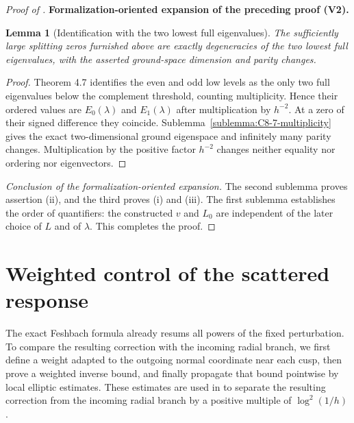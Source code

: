 \documentclass[11pt]{article}
\newtheorem{lemma}[theorem]{Lemma}
\newcommand{\formalisationparentid}{X}
\newenvironment{formalisationaddition}[1]{\par\medskip\begingroup\color{blue}\def\formalisationparentid{#1}\setcounter{formalizationsublemma}{0}\let\lemma\formalizationsublemma\let\endlemma\endformalizationsublemma
  \def\Eo{\mathcal E_h^\circ}\def\EE{\mathcal E_h}\def\phio{\phi_h^\circ}\def\phih{\phi_h}\def\Ho{H_h^{\rm atom}(v^\circ)}\def\Ha{H_h^{\rm atom}}\def\HL{H_h^{L}}\def\Dh{D_h}\def\Log{\operatorname{Log}}\def\ellh{\ell_h}\def\Gp{G_{p,h}}\def\Ast{A_{*,h}}\def\ahat{\widehat{\mathfrak a}_h}\def\ah{\mathfrak a_h}\def\rh{\widehat\rho_h}\def\deltah{\widehat\delta_h}\def\oldref##1{\textup{(##1)}}\def\interface##1{\par\noindent\textit{Analytical interface used here.} ##1\par}\def\finish{\par\noindent\textit{Conclusion of the formalization-oriented expansion.} }\par\noindent\textbf{Formalization-oriented expansion of the preceding proof (V2).}\par\smallskip
}{\par\endgroup\medskip
}
\begin{document}
\begin{proof}[Proof of ]
\begin{formalisationaddition}{T1.1}
\begin{lemma}[Identification with the two lowest full eigenvalues]\label{sublemma:T1-1-full-ground-space}
The sufficiently large splitting zeros furnished above are exactly degeneracies of the two lowest full eigenvalues, with the asserted ground-space dimension and parity changes.
\end{lemma}
\begin{proof}
Theorem 4.7 identifies the even and odd low levels as the only two full eigenvalues below the complement threshold, counting multiplicity. Hence their ordered values are $E_0(\lambda)$ and $E_1(\lambda)$ after multiplication by $h^{-2}$. At a zero of their signed difference they coincide. Sublemma~\ref{sublemma:C8-7-multiplicity} gives the exact two-dimensional ground eigenspace and infinitely many parity changes. Multiplication by the positive factor $h^{-2}$ changes neither equality nor ordering nor eigenvectors.
\end{proof}
\finish The second sublemma proves assertion (ii), and the third proves (i) and (iii). The first sublemma establishes the order of quantifiers: the constructed $v$ and $L_0$ are independent of the later choice of $L$ and of $\lambda$. This completes the proof.
\end{formalisationaddition}

\end{proof}

\clearpage
\appendix
\section{Weighted control of the scattered response}\label{app:control-scat-response}
The exact Feshbach formula already resums all powers of the fixed perturbation.
To compare the resulting correction with the incoming radial branch, we first
define a weight adapted to the outgoing normal coordinate near each cusp, then prove a weighted inverse
bound, and finally propagate that bound pointwise by local elliptic estimates.
These estimates are used in  to separate the
resulting correction from the incoming radial branch by a positive multiple of
$\log^2(1/h)$.
\end{document}
